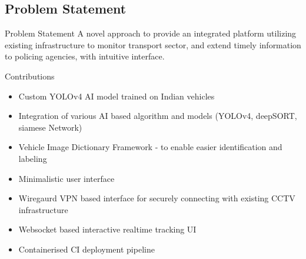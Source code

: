\documentclass{beamer}
\begin{document}

	\subsection{Problem Statement}
	\begin{frame}{Problem Statement}
		A novel approach to provide an integrated platform utilizing existing infrastructure to monitor transport sector, and extend timely information to policing agencies, with intuitive interface.
	\end{frame}

	\begin{frame}{Contributions}
		\begin{itemize}
			\item Custom YOLOv4 AI model trained on Indian vehicles
			\item Integration of various AI based algorithm and models (YOLOv4, deepSORT, siamese Network)
   			\item Vehicle Image Dictionary Framework - to enable easier identification and labeling 
			\item Minimalistic user interface
			\item Wiregaurd VPN based interface for securely connecting with existing CCTV infrastructure
   			\item Websocket based interactive realtime tracking UI 
			\item Containerised CI deployment pipeline 
		\end{itemize}
	\end{frame}
	
\end{document}
